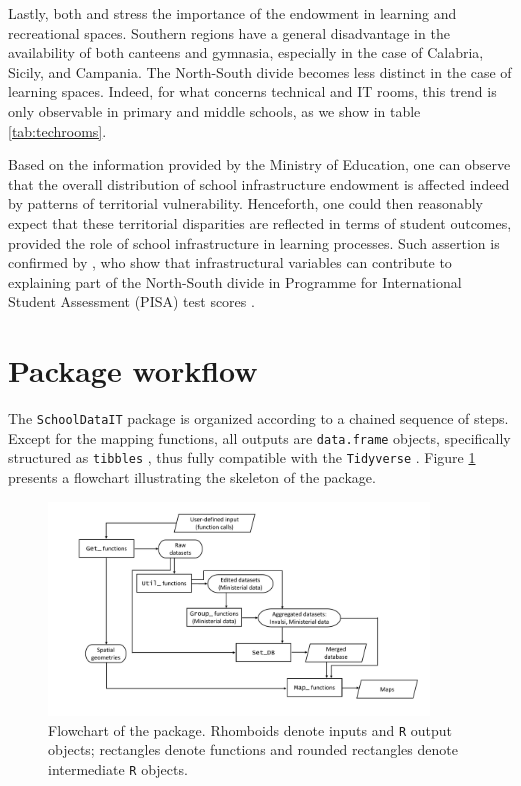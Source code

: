 \documentclass{book}
\begin{document}
Lastly, both \cite{Garlaschi} and \cite{BDI} stress the importance of the endowment in learning and recreational spaces. Southern regions have a general disadvantage in the availability of both canteens and gymnasia, especially in the case of Calabria, Sicily, and Campania. The North-South divide becomes less distinct in the case of learning spaces. Indeed, for what concerns technical and IT rooms, this trend is only observable in primary and middle schools, as we show in table \ref{tab:techrooms}.

Based on the information provided by the Ministry of Education, one can observe that the overall distribution of school infrastructure endowment is affected indeed by patterns of territorial vulnerability. Henceforth, one could then reasonably expect that these territorial disparities are reflected in terms of student outcomes, provided the role of school infrastructure in learning processes. Such assertion is confirmed by \cite{Bratti}, who show that infrastructural variables can contribute to explaining part of the North-South divide in Programme for International Student Assessment (PISA) test scores \citep{OECD_PISA2024}.





\section{Package workflow} \label{section:Workflow}
The \texttt{SchoolDataIT} package is organized according to a chained sequence of steps. Except for the mapping functions, all outputs are \texttt{data.frame} objects, specifically structured as \texttt{tibbles} \citep{tibble}, thus fully compatible with the \texttt{Tidyverse} \citep{tidyverse}. Figure \ref{fig:Flowchart} presents a flowchart illustrating the skeleton of the package.

\begin{figure}
  \centering
  \includegraphics[width = 0.9\textwidth]{SchoolDataIT/Fig1.pdf} 
  \caption{Flowchart of the package. Rhomboids denote inputs and \texttt{R} output objects; rectangles denote functions and rounded rectangles denote intermediate \texttt{R} objects.}
  \label{fig:Flowchart}
\end{figure}
\end{document}
